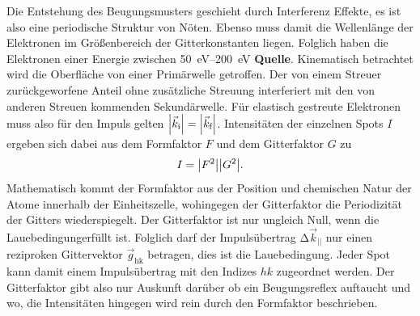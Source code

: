         Die Entstehung des Beugungsmusters geschieht durch Interferenz Effekte, es ist also eine periodische Struktur von Nöten.
        Ebenso muss damit die Wellenlänge der Elektronen im Größenbereich der Gitterkonstanten liegen.
        Folglich haben die Elektronen einer Energie zwischen \SIrange{50}{200}{\electronvolt} \textbf{Quelle}.
        Kinematisch betrachtet wird die Oberfläche von einer Primärwelle getroffen.
        Der von einem Streuer zurückgeworfene Anteil ohne zusätzliche Streuung interferiert mit den von anderen Streuen kommenden Sekundärwelle.
        Für elastisch gestreute Elektronen muss also für den Impuls gelten $\abs*{\vec{k}_\text{i}} = \abs*{\vec{k}_\text{f}}$.
        Intensitäten der einzelnen Spots $I$ ergeben sich dabei aus dem Formfaktor $F$ und dem Gitterfaktor $G$ zu
        \begin{equation}
            I = \abs*{F^2}\abs*{G^2}.
            \label{eqn:LEED}
        \end{equation}
        Mathematisch kommt der Formfaktor aus der Position und chemischen Natur der Atome innerhalb der Einheitszelle, wohingegen der Gitterfaktor die Periodizität der Gitters wiederspiegelt.
        Der Gitterfaktor ist nur ungleich Null, wenn die Lauebedingungerfüllt ist.
        Folglich darf der Impulsübertrag $\increment \vec{k}_{||}$ nur einen reziproken Gittervektor $\vec{g}_\text{hk}$ betragen, dies ist die Lauebedingung.
        Jeder Spot kann damit einem Impulsübertrag mit den Indizes $hk$ zugeordnet werden.
        Der Gitterfaktor gibt also nur Auskunft darüber ob ein Beugungsreflex auftaucht und wo, die Intensitäten hingegen wird rein durch den Formfaktor beschrieben.

